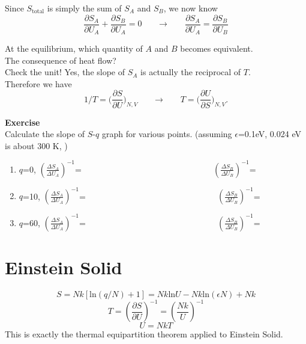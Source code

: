 Since $S_\text{total}$ is simply the sum of $S_A$ and $S_B$, we now know
\begin{equation} \label{entropy} 
\frac {\partial{S_A}} {\partial{U_A}} +  \frac {\partial{S_B}} {\partial{U_A}} =0     ~~~~~~~~ \rightarrow~~~~~~~~  
\frac {\partial{S_A}} {\partial{U_A}} =  \frac {\partial{S_B}} {\partial{U_B}} 
\end{equation}

At the equilibrium, which quantity of $A$ and $B$ becomes equivalent. \\
The consequence of heat flow?\\
Check the unit! Yes, the slope of $S_A$ is actually the reciprocal of $T$.\\
Therefore we have
\begin{equation} 
1/T = \Bigg(\frac {\partial{S}} {\partial{U}}\Bigg)_{N, V} ~~~~~~~~ \rightarrow~~~~~~~~ T = \Bigg(\frac {\partial{U}} {\partial{S}}\Bigg)_{N, V}.
\end{equation}

{\bf Exercise}\\
Calculate the slope of $S$-$q$ graph for various points. (assuming $\epsilon$=0.1eV, 0.024 eV is about 300 K, )\\
\begin{enumerate}
\item $q$=0,  $(\frac {\Delta{S_A}} {\Delta{U_A}})^{-1}$=  ~~~~~~~~~~~~~~~~~~~~~~~~~~~~~~  $(\frac {\Delta{S_B}} {\Delta{U_B}})^{-1}$= 
\item $q$=10, $(\frac {\Delta{S_A}} {\Delta{U_A}})^{-1}$=  ~~~~~~~~~~~~~~~~~~~~~~~~~~~~~~  $(\frac {\Delta{S_B}} {\Delta{U_B}})^{-1}$= 
\item $q$=60, $(\frac {\Delta{S_A}} {\Delta{U_A}})^{-1}$=  ~~~~~~~~~~~~~~~~~~~~~~~~~~~~~~  $(\frac {\Delta{S_B}} {\Delta{U_B}})^{-1}$= 
\end{enumerate}

\section{Einstein Solid}

\begin{equation} S = Nk[\text{ln}(q/N)+1] = Nk\text{ln}U - Nk\text{ln}(\epsilon N) + Nk \end{equation}
\begin{equation} T = (\frac {\partial{S}} {\partial{U}})^{-1} = (\frac{Nk}{U})^{-1}\end{equation}
\begin{equation} U = NkT \end{equation}
This is exactly the thermal equipartition theorem applied to Einstein Solid.

